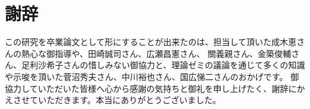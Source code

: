 \section*{謝辞}
この研究を卒業論文として形にすることが出来たのは、担当して頂いた成木恵さんの熱心な御指導や、田崎誠司さん、広瀬昌憲さん、
關義親さん、金築俊輔さん、足利沙希子さんの惜しみない御協力と、理論ゼミの議論を通じて多くの知識や示唆を頂いた菅沼秀夫さん、中川裕也さん、国広悌二さんのおかげです。
御協力していただいた皆様へ心から感謝の気持ちと御礼を申し上げたく、謝辞にかえさせていただきます。本当にありがとうございました。
